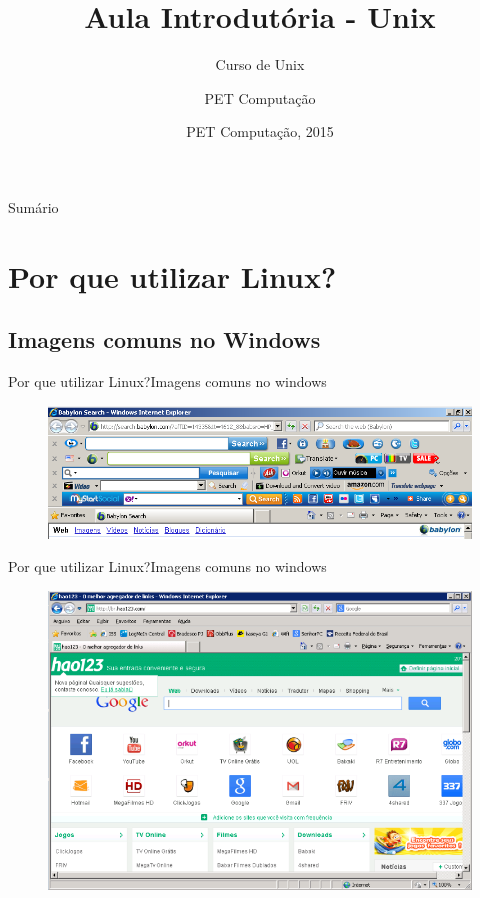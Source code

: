 \documentclass{beamer}
\title{Aula Introdutória - Unix}
\subtitle{Curso de Unix}
\author{PET Computa\c{c}ão}
\institute[UFSC] %
{
%
  Departamento de Informática e Estatística\\
  Universidade de Santa Catarina}
\date{PET Computa\c{c}ão, 2015}
\begin{document}
\begin{frame}
  \titlepage
\end{frame}

\begin{frame}{Sumário}
  \tableofcontents
\end{frame}

\section{Por que utilizar Linux?}

\subsection{Imagens comuns no Windows}

\begin{frame}{Por que utilizar Linux?}{Imagens comuns no windows}
    \begin{figure}[h!]
        \centering
        \includegraphics[scale=0.40]{toolbars.png}
    \end{figure}
\end{frame}

\begin{frame}{Por que utilizar Linux?}{Imagens comuns no windows}
    \begin{figure}[h!]
        \centering
        \includegraphics[scale=0.3]{hao123.png}
    \end{figure}
\end{frame}
\end{document}

